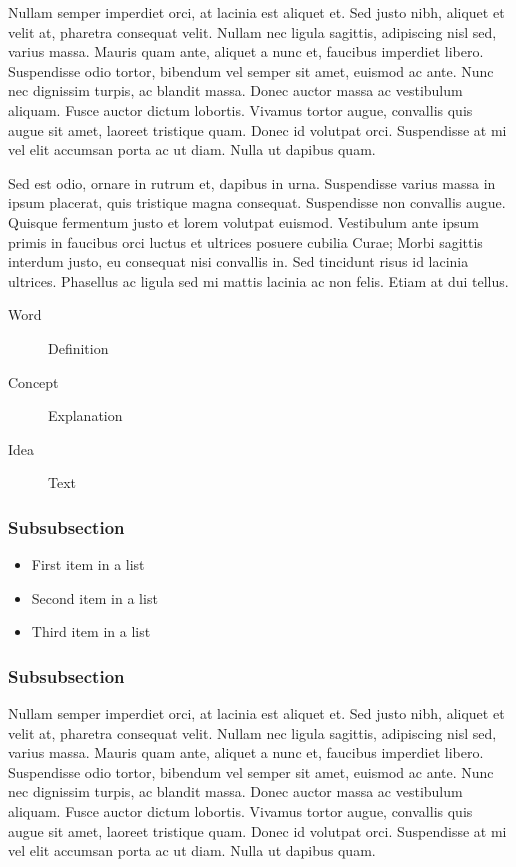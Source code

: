 \documentclass[fleqn,10pt]{JLA_article} %
\begin{document}
Nullam semper imperdiet orci, at lacinia est aliquet et. Sed justo nibh, aliquet et velit at, pharetra consequat velit. Nullam nec ligula sagittis, adipiscing nisl sed, varius massa. Mauris quam ante, aliquet a nunc et, faucibus imperdiet libero. Suspendisse odio tortor, bibendum vel semper sit amet, euismod ac ante. Nunc nec dignissim turpis, ac blandit massa. Donec auctor massa ac vestibulum aliquam. Fusce auctor dictum lobortis. Vivamus tortor augue, convallis quis augue sit amet, laoreet tristique quam. Donec id volutpat orci. Suspendisse at mi vel elit accumsan porta ac ut diam. Nulla ut dapibus quam.

Sed est odio, ornare in rutrum et, dapibus in urna. Suspendisse varius massa in ipsum placerat, quis tristique magna consequat. Suspendisse non convallis augue. Quisque fermentum justo et lorem volutpat euismod. Vestibulum ante ipsum primis in faucibus orci luctus et ultrices posuere cubilia Curae; Morbi sagittis interdum justo, eu consequat nisi convallis in. Sed tincidunt risus id lacinia ultrices. Phasellus ac ligula sed mi mattis lacinia ac non felis. Etiam at dui tellus.

\begin{description}
\item[Word] Definition
\item[Concept] Explanation
\item[Idea] Text
\end{description}

\hypertarget{subsubsection-1}{%
\subsubsection{Subsubsection}\label{subsubsection-1}}

\begin{itemize}[noitemsep] %
\item First item in a list
\item Second item in a list
\item Third item in a list
\end{itemize}

\hypertarget{subsubsection-2}{%
\subsubsection{Subsubsection}\label{subsubsection-2}}

Nullam semper imperdiet orci, at lacinia est aliquet et. Sed justo nibh, aliquet et velit at, pharetra consequat velit. Nullam nec ligula sagittis, adipiscing nisl sed, varius massa. Mauris quam ante, aliquet a nunc et, faucibus imperdiet libero. Suspendisse odio tortor, bibendum vel semper sit amet, euismod ac ante. Nunc nec dignissim turpis, ac blandit massa. Donec auctor massa ac vestibulum aliquam. Fusce auctor dictum lobortis. Vivamus tortor augue, convallis quis augue sit amet, laoreet tristique quam. Donec id volutpat orci. Suspendisse at mi vel elit accumsan porta ac ut diam. Nulla ut dapibus quam.
\end{document}
